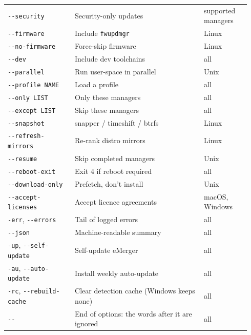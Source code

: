 \documentclass[11pt,a4paper]{article}
\begin{document}
\begin{center}
\begin{longtable}{@{}p{0.26\linewidth} p{0.50\linewidth} p{0.18\linewidth}@{}}
\texttt{-{}-security}                      & Security-only updates          & supported managers \\
\texttt{-{}-firmware}                      & Include \texttt{fwupdmgr}      & Linux \\
\texttt{-{}-no-firmware}                   & Force-skip firmware            & Linux \\
\texttt{-{}-dev}                           & Include dev toolchains         & all \\
\texttt{-{}-parallel}                      & Run user-space in parallel     & Unix \\
\texttt{-{}-profile NAME}                  & Load a profile                 & all \\
\texttt{-{}-only LIST}                     & Only these managers            & all \\
\texttt{-{}-except LIST}                   & Skip these managers            & all \\
\texttt{-{}-snapshot}                      & snapper / timeshift / btrfs    & Linux \\
\texttt{-{}-refresh-mirrors}               & Re-rank distro mirrors         & Linux \\
\texttt{-{}-resume}                        & Skip completed managers        & Unix \\
\texttt{-{}-reboot-exit}                   & Exit 4 if reboot required      & all \\
\texttt{-{}-download-only}                  & Prefetch, don't install        & Unix \\
\texttt{-{}-accept-licenses}               & Accept licence agreements      & macOS, Windows \\
\texttt{-err}, \texttt{-{}-errors}         & Tail of logged errors          & all \\
\texttt{-{}-json}                          & Machine-readable summary       & all \\
\texttt{-up}, \texttt{-{}-self-update}     & Self-update eMerger            & all \\
\texttt{-au}, \texttt{-{}-auto-update}     & Install weekly auto-update     & all \\
\texttt{-rc}, \texttt{-{}-rebuild-cache}   & Clear detection cache (Windows keeps none) & all \\
\texttt{-{}-}                              & End of options: the words after it are ignored & all \\
\bottomrule
\end{longtable}
\end{center}
\end{document}
